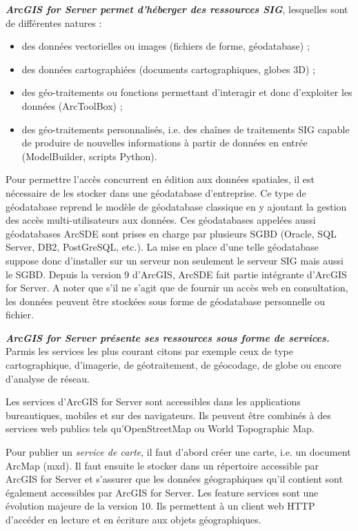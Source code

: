 \documentclass[11pt]{article}
\begin{document}
\textbf{\emph{ArcGIS for Server permet d’héberger des ressources SIG}}, lesquelles sont de différentes  natures : 
\begin{itemize}
	\item des données vectorielles ou images (fichiers de forme, géodatabase) ;
	\item des données cartographiées (documents cartographiques, globes 3D) ;
	\item des géo-traitements ou fonctions permettant d’interagir et donc d’exploiter les données (ArcToolBox) ;
	\item des géo-traitements personnalisés, i.e. des chaînes de traitements SIG capable de produire de nouvelles informations à partir de données en entrée (ModelBuilder, scripts Python).
\end{itemize}

Pour permettre l’accès concurrent en édition aux données spatiales, il est nécessaire de les stocker dans une géodatabase d’entreprise. Ce type de géodatabase reprend le modèle de géodatabase classique en y ajoutant la gestion des accès multi-utilisateurs aux données. Ces géodatabases appelées aussi géodatabases ArcSDE sont prises en charge par plusieurs SGBD (Oracle, SQL Server, DB2, PostGreSQL, etc.). La mise en place d’une telle géodatabase suppose donc d’installer sur un serveur non seulement le serveur SIG mais aussi le SGBD. Depuis la version 9 d’ArcGIS, ArcSDE fait partie intégrante d’ArcGIS for Server. A noter que s’il ne s’agit que de fournir un accès web en consultation, les données peuvent être stockées sous forme de géodatabase personnelle ou fichier.
\vspace{2em}

\textbf{\emph{ArcGIS for Server présente ses ressources sous forme de services.}} Parmis les services les plus courant citons par exemple ceux de type cartographique, d'imagerie, de géotraitement, de géocodage, de globe ou encore d'analyse de réseau.

Les services d'ArcGIS for Server sont accessibles dans les applications bureautiques, mobiles et sur des navigateurs. Ils peuvent être combinés à des services web publics tels qu'OpenStreetMap ou World Topographic Map.

Pour publier un \textit{service de carte}, il faut d’abord créer une carte, i.e. un document ArcMap (mxd). Il faut ensuite le stocker dans un répertoire accessible par ArcGIS for Server et s’assurer que les données géographiques qu’il contient sont également accessibles par ArcGIS for Server.
Les feature services sont une évolution majeure de la version 10. Ils permettent à un client web HTTP d’accéder en lecture et en écriture aux objets géographiques.
\end{document}
